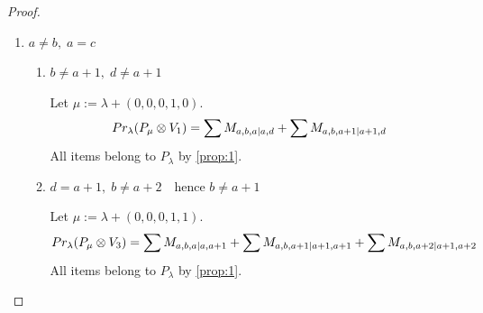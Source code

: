 \begin{proof}
\begin{enumerate}
    \item $ a \neq b,\; a=c $
      \begin{enumerate}
        \item $ b \neq a+1, \; d \neq a+1 $ \par
        Let $\mu:=\lambda + (0,0,0,1,0) $.
        \begin{equation}\notag
          \begin{aligned}
            Pr_{\lambda}(P_\mu \otimes V_{1}) &=
\sum M_{a,b,a|a,d}
+\sum M_{a,b,a+1|a+1,d}
          \end{aligned}
        \end{equation}
All items belong to $P_\lambda$ by \cref{prop:1}.

\item $ d=a+1, \; b \neq a+2 \quad \text{hence }b\neq a+1$ \par
        Let $\mu:=\lambda + (0,0,0,1,1) $.
        \begin{equation}\notag
          \begin{aligned}
            Pr_{\lambda}(P_\mu \otimes V_{3}) &=
\sum M_{a,b,a|a,a+1}
+\sum M_{a,b,a+1|a+1,a+1}
+\sum M_{a,b,a+2|a+1,a+2}
          \end{aligned}
        \end{equation}
All items belong to $P_\lambda$ by \cref{prop:1}.


\end{enumerate}
\end{enumerate}
\end{proof}
